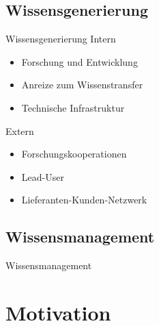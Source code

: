\documentclass[ngerman,compress,hyperref={bookmarks}]{beamer}
\begin{document}
\subsection{Wissensgenerierung}
\begin{frame}{Wissensgenerierung}
Intern
\begin{itemize}
 \item Forschung und Entwicklung
 \item Anreize zum Wissenstransfer
 \item Technische Infrastruktur
\end{itemize}
Extern
\begin{itemize}
 \item Forschungskooperationen
 \item Lead-User
 \item Lieferanten-Kunden-Netzwerk
\end{itemize}
\end{frame}

\subsection{Wissensmanagement}
\begin{frame}{Wissensmanagement}
\end{frame}

\frame{\titlepage}



\section{Motivation}
\end{document}
